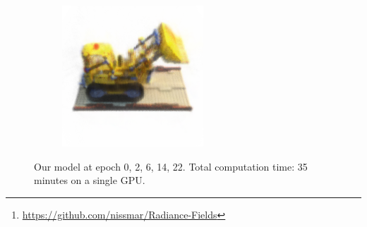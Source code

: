 \documentclass{article}
\begin{document}
\begin{figure}[!h]
\begin{subfigure}{.19\textwidth}
\end{subfigure}
\begin{subfigure}{.19\textwidth}
  \centering
  \includegraphics[width=\linewidth]{figs/model32.png}  
\end{subfigure}
     \caption{Our model at epoch {0, 2, 6, 14, 22}. Total computation time: 35 minutes on a single GPU.}
    \label{fig:lego_optim}
\end{figure}


\begin{abstract}
This project report is a study of the article \textbf{Plenoxels: Radiance Fields without Neural Networks} \cite{plenoxels}. Being in the impossibility of using the provided custom CUDA kernel, we have re-implemented the method and a few of the proposed optimizations from scratch. Limiting ourselves to a small 128-sized grid, our implementation achieves a peak-signal-to-noise ratio of $22.10$ dB, not so far from the $23.74$ dB mentioned in the article with a similar setting. Inspired by \textbf{Space carving} \cite{spacecarving}, we show that this method can be extended to generate clean point clouds from photographs, and propose a different optimization method, which achieves a PSNR of $22.90$ dB. We strongly urge the reader to visit our GitHub repository\footnote{\url{https://github.com/nissmar/Radiance-Fields}} which contains animated GIFs, allowing a better understanding of our results (which are on the last page of this report).
\end{abstract}
\end{document}
